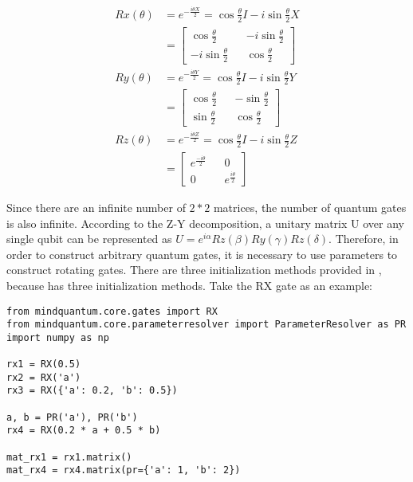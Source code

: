 \begin{align*}
    Rx(\theta) & =
    e^{-\frac{i\theta X}{2}}=
    \cos{\frac{\theta}{2}}I-i\sin{\frac{\theta}{2}}X \\
               & =\begin{bmatrix}
        \cos{\frac{\theta}{2}}   &  & -i\sin{\frac{\theta}{2}} \\
        -i\sin{\frac{\theta}{2}} &  & \cos{\frac{\theta}{2}}
    \end{bmatrix}         \\
    Ry(\theta) & =
    e^{-\frac{i\theta Y}{2}}=
    \cos{\frac{\theta}{2}}I-i\sin{\frac{\theta}{2}}Y \\
               & =    \begin{bmatrix}
        \cos{\frac{\theta}{2}} &  & -\sin{\frac{\theta}{2}} \\
        \sin{\frac{\theta}{2}} &  & \cos{\frac{\theta}{2}}
    \end{bmatrix}     \\
    Rz(\theta) & =
    e^{-\frac{i\theta Z}{2}}=
    \cos{\frac{\theta}{2}}I-i\sin{\frac{\theta}{2}}Z \\
               & =    \begin{bmatrix}
        e^{\frac{-i\theta}{2}} &  & 0                     \\
        0                      &  & e^{\frac{i\theta}{2}}
    \end{bmatrix}
\end{align*}


Since there are an infinite number of $2*2$ matrices, the number of quantum gates is also infinite. According to the Z-Y decomposition, a unitary matrix U over any single qubit can be represented as $U=e^{i\alpha}Rz(\beta)Ry(\gamma)Rz(\delta)$. Therefore, in order to construct arbitrary quantum gates, it is necessary to use parameters to construct rotating gates. There are three initialization methods provided in \MindQuantum, because \ParameterResolver has three initialization methods. Take the RX gate as an example:

\begin{lstlisting}
from mindquantum.core.gates import RX
from mindquantum.core.parameterresolver import ParameterResolver as PR
import numpy as np

rx1 = RX(0.5)
rx2 = RX('a')
rx3 = RX({'a': 0.2, 'b': 0.5})

a, b = PR('a'), PR('b')
rx4 = RX(0.2 * a + 0.5 * b)

mat_rx1 = rx1.matrix()
mat_rx4 = rx4.matrix(pr={'a': 1, 'b': 2})
\end{lstlisting}

